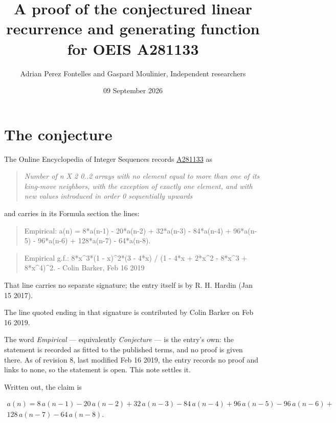 \documentclass[11pt]{article}
\title{A proof of the conjectured linear recurrence and generating function for OEIS A281133}
\author{Adrian Perez Fontelles and Gaspard Moulinier, Independent researchers}
\date{09 September 2026}
\theoremstyle{definition}
\begin{document}
\maketitle
\section{The conjecture}

The Online Encyclopedia of Integer Sequences records \href{https://oeis.org/A281133}{A281133} as

\begin{quote}\itshape Number of n X 2 0..2 arrays with no element equal to more than one of its king-move neighbors, with the exception of exactly one element, and with new values introduced in order 0 sequentially upwards\end{quote}

and carries in its Formula section the lines:

\begin{quote}\ttfamily Empirical: a(n) = 8*a(n-1) - 20*a(n-2) + 32*a(n-3) - 84*a(n-4) + 96*a(n-5) - 96*a(n-6) + 128*a(n-7) - 64*a(n-8).\end{quote}

\begin{quote}\ttfamily Empirical g.f.: 8*x\textasciicircum{}3*(1 - x)\textasciicircum{}2*(3 - 4*x) / (1 - 4*x + 2*x\textasciicircum{}2 - 8*x\textasciicircum{}3 + 8*x\textasciicircum{}4)\textasciicircum{}2. - Colin Barker, Feb 16 2019\end{quote}

That line carries no separate signature; the entry itself is by R. H. Hardin (Jan 15 2017).

The line quoted ending in that signature is contributed by Colin Barker on Feb 16 2019.

The word {\itshape Empirical} --- equivalently {\itshape Conjecture} --- is the entry's own: the statement is recorded as fitted to the published terms, and no proof is given there. As of revision 8, last modified Feb 16 2019, the entry records no proof and links to none, so the statement is open. This note settles it.

Written out, the claim is

\begin{multline*} a(n) = 8\,a(n-1) - 20\,a(n-2) + 32\,a(n-3) - 84\,a(n-4) + 96\,a(n-5) - 96\,a(n-6) + \\ 128\,a(n-7) - 64\,a(n-8). \end{multline*}
\end{document}
